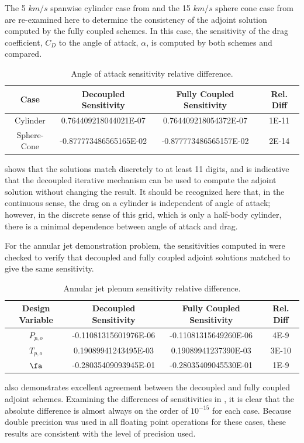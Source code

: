 The 5 $km/s$ spanwise cylinder case from  and the 15
$km/s$ sphere cone case from  are re-examined here
to determine the consistency of the adjoint solution computed by the fully
coupled schemes.  In this case, the sensitivity of the drag coefficient, $C_D$
to the angle of attack, $\alpha$, is computed by both schemes and compared.
\begin{table}[h]
  \centering
  \begin{tabular}{c|c|c|c}
    Case & Decoupled Sensitivity & Fully Coupled Sensitivity & Rel. Diff\\
    \hline
    Cylinder    &  0.764409218044021E-07 &  0.764409218054372E-07 & 1E-11 \\
    Sphere-Cone & -0.877773486565165E-02 & -0.877773486565157E-02 & 2E-14
  \end{tabular}
  \caption{Angle of attack sensitivity relative difference.}
  \label{tab:cylinder-adj-diff}
\end{table}
 shows that the solutions match discretely to at
least 11 digits, and is indicative that the decoupled iterative mechanism can be
used to compute the adjoint solution without changing the result.  It should be
recognized here that, in the continuous sense, the drag on a cylinder is
independent of angle of attack; however, in the discrete sense of this grid,
which is only a half-body cylinder, there is a minimal dependence between angle
of attack and drag.

For the annular jet demonstration problem, the sensitivities computed in
 were checked to verify that decoupled and fully
coupled adjoint solutions matched to give the same sensitivity.
\begin{table}[h]
  \centering
  \begin{tabular}{c|c|c|c}
    Design Variable & Decoupled Sensitivity & Fully Coupled Sensitivity & Rel. Diff\\
    \hline
    $P_{p,o}$ & -0.11081315601976E-06 & -0.11081315649260E-06 & 4E-9  \\
    $T_{p,o}$ &  0.19089941243495E-03 &  0.19089941237390E-03 & 3E-10 \\
    $\fa$     & -0.28035409093945E-01 & -0.28035409045530E-01 & 1E-9
  \end{tabular}
  \caption{Annular jet plenum sensitivity relative difference.}
  \label{tab:srp-adj-diff}
\end{table}
 also demonstrates excellent agreement between the
decoupled and fully coupled adjoint schemes.  Examining the differences of
sensitivities in , it is clear
that the absolute difference is almost always on the order of $10^{-15}$ for
each case.  Because double precision was used in all floating point operations for
these cases, these results are consistent with the level of precision used.

